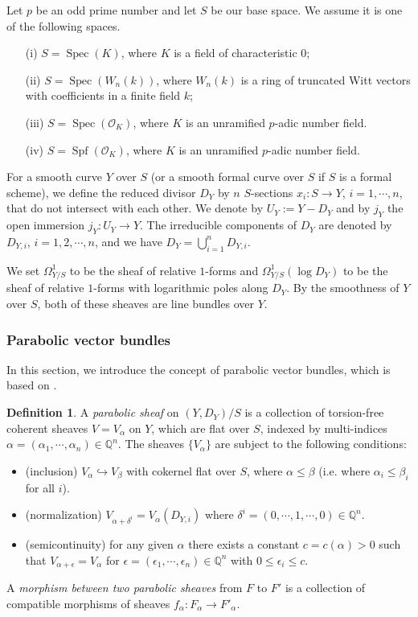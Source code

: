 \documentclass[12pt,twoside]{book}
\theoremstyle{plain}
\theoremstyle{definition}
\newtheorem{definition}[definition]{Definition}
\theoremstyle{remark}
\newcommand{\bQ}{{\mathbb Q}}
\newcommand{\mO}{{\mathcal O}}
\DeclareMathOperator\Spec{Spec}
\DeclareMathOperator\Spf{Spf}
\numberwithin{equation}{section}
\begin{document}
Let $p$ be an odd prime number and let $S$ be our base space. We assume it is one of the following spaces.
\begin{enumerate}
\item[(i)] $S=\Spec(K)$, where $K$ is a field of characteristic $0$;
\item[(ii)] $S=\Spec(W_n(k))$, where $W_n(k)$ is a ring of truncated Witt vectors with coefficients in a finite field $k$;
\item[(iii)] $S=\Spec(\mO_K)$, where $K$ is an unramified $p$-adic number field.
\item[(iv)] $S=\Spf(\mO_K)$, where $K$ is an unramified $p$-adic number field.
\end{enumerate}
For a smooth curve $Y$ over $S$ (or a smooth formal curve over $S$ if $S$ is a formal scheme), we define the reduced divisor $D_Y$ by $n$ $S$-sections $x_i\colon S\rightarrow Y$, $i=1,\cdots,n$, that do not intersect with each other. We denote by $U_Y := Y - D_Y$ and by $j_Y$ the open immersion $j_Y\colon U_Y\rightarrow Y$. The irreducible components of $D_Y$ are denoted by $D_{Y,i}$, $i=1,2,\cdots,n$, and we have $D_Y = \bigcup_{i=1}^n D_{Y,i}$.

We set $\Omega_{Y/S}^1$ to be the sheaf of relative $1$-forms and $\Omega_{Y/S}^1(\log D_Y)$ to be the sheaf of relative $1$-forms with logarithmic poles along $D_Y$. By the smoothness of $Y$ over $S$, both of these sheaves are line bundles over $Y$.


\subsubsection{Parabolic vector bundles}

In this section, we introduce the concept of parabolic vector bundles, which is based on \cite{IySi07}.

\begin{definition}
A \emph{parabolic sheaf} on $(Y,D_Y)/S$ is a collection of torsion-free coherent sheaves $V={V_\alpha}$ on $Y$, which are flat over $S$, indexed by multi-indices $\alpha=(\alpha_1,\cdots,\alpha_n)\in \bQ^n$. The sheaves $\{V_\alpha\}$ are subject to the following conditions:
\begin{itemize}
\item (inclusion) $V_\alpha \hookrightarrow V_\beta$ with cokernel flat over $S$, where $\alpha\leq \beta$ (i.e. where $\alpha_i\leq \beta_i$ for all $i$).
\item (normalization) $V_{\alpha+\delta^i} = V_\alpha(D_{Y,i})$ where $\delta^i=(0,\cdots,1,\cdots,0)\in\bQ^n$.
\item (semicontinuity) for any given $\alpha$ there exists a constant $c=c(\alpha)>0$ such that $V_{\alpha+\epsilon} = V_\alpha$ for $\epsilon=(\epsilon_1,\cdots,\epsilon_n)\in\bQ^n$ with $0\leq\epsilon_i\leq c$.
\end{itemize}
A \emph{morphism between two parabolic sheaves} from $F$ to $F'$ is a collection of compatible morphisms of sheaves $f_\alpha\colon F_\alpha\rightarrow F'_\alpha$.
\end{definition}
\end{document}
